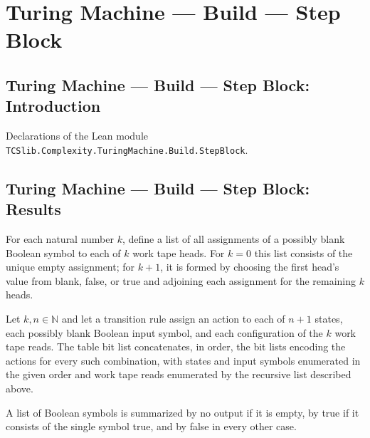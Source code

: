 \section{Turing Machine --- Build --- Step Block}
\subsection*{Turing Machine --- Build --- Step Block: Introduction}

Declarations of the Lean module \texttt{TCSlib.Complexity.TuringMachine.Build.StepBlock}.

\subsection*{Turing Machine --- Build --- Step Block: Results}

\begin{definition}
\label{Turing.workReadsK}
\leanok
For each natural number $k$, define a list of all assignments of a possibly blank
Boolean symbol to each of $k$ work tape heads. For $k=0$ this list consists of the
unique empty assignment; for $k+1$, it is formed by choosing the first head’s value from
blank, false, or true and adjoining each assignment for the remaining $k$ heads.
\end{definition}

\begin{definition}
\label{Turing.tableBitsK}
\leanok
{}
Let $k,n\in\mathbb{N}$ and let a transition rule assign an action to each of $n+1$
states, each possibly blank Boolean input symbol, and each configuration of the $k$ work
tape reads. The table bit list concatenates, in order, the bit lists encoding the
actions for every such combination, with states and input symbols enumerated in the
given order and work tape reads enumerated by the recursive list described above.
\end{definition}

\begin{definition}
\label{Turing.StepBlock.outputSummary}
\leanok
A list of Boolean symbols is summarized by no output if it is empty, by true if it
consists of the single symbol true, and by false in every other case.
\end{definition}

